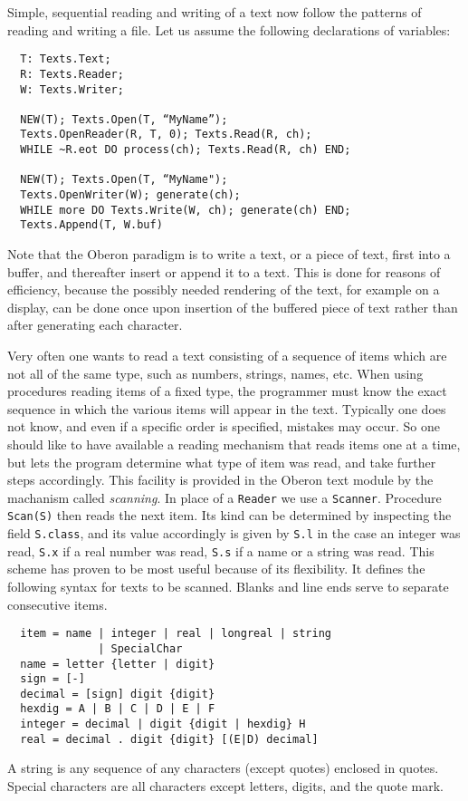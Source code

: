 Simple, sequential reading and writing of a text now follow the patterns of reading and
writing a file.  Let us assume the following declarations of variables:
\begin{verbatim}
  T: Texts.Text;
  R: Texts.Reader;
  W: Texts.Writer;

  NEW(T); Texts.Open(T, “MyName”);
  Texts.OpenReader(R, T, 0); Texts.Read(R, ch);
  WHILE ~R.eot DO process(ch); Texts.Read(R, ch) END;

  NEW(T); Texts.Open(T, “MyName");
  Texts.OpenWriter(W); generate(ch);
  WHILE more DO Texts.Write(W, ch); generate(ch) END;
  Texts.Append(T, W.buf)
\end{verbatim}
Note that the Oberon paradigm is to write a text, or a piece of text, first into a buffer,
and thereafter insert or append it to a text. This is done for reasons of efficiency,
because the possibly needed rendering of the text, for example on a display, can be done
once upon insertion of the buffered piece of text rather than after generating each character.

Very often one wants to read a text consisting of a sequence of items which are not all of
the same type, such as numbers, strings, names, etc. When using procedures reading items
of a fixed type, the programmer must know the exact sequence in which the various items will
appear in the text. Typically one does not know, and even if a specific order is specified,
mistakes may occur. So one should like to have available a reading mechanism that reads
items one at a time, but lets the program determine what type of item was read, and take
further steps accordingly. This facility is provided in the Oberon text module by the machanism
called \emph{scanning}. In place of a \verb|Reader| we use a \verb|Scanner|.  Procedure
\verb|Scan(S)| then reads the next item. Its kind can be determined by inspecting the field
\verb|S.class|, and its value accordingly is given by \verb|S.l| in the case an integer was
read, \verb|S.x| if a real number was read, \verb|S.s| if a name or a string was read. This
scheme has proven to be most useful because of its flexibility. It defines the following
syntax for texts to be scanned. Blanks and line ends serve to separate consecutive items.
\begin{verbatim}
  item = name | integer | real | longreal | string
              | SpecialChar
  name = letter {letter | digit}
  sign = [-]
  decimal = [sign] digit {digit}
  hexdig = A | B | C | D | E | F
  integer = decimal | digit {digit | hexdig} H
  real = decimal . digit {digit} [(E|D) decimal]
\end{verbatim}
A string is any sequence of any characters (except quotes) enclosed in quotes. Special
characters are all characters except letters, digits, and the quote mark.


